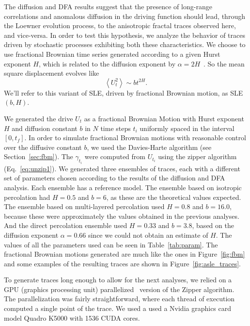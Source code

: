 The diffusion and DFA results suggest that the presence of long-range
correlations and anomalous diffusion in the driving function should lead,
through the Loewner evolution process, to the anisotropic fractal traces
observed here, and vice-versa. In order to test this hypothesis, we analyze the
behavior of traces driven by stochastic processes exhibiting both these
characteristics. We choose to use fractional Brownian time series generated
according to a given Hurst exponent $H$, which is related to the diffusion
exponent by $\alpha=2H$~\cite{Mandelbrot1968}. So the mean square displacement
evolves like
\begin{equation}
    \left\langle U_{t}^{2}\right\rangle \sim bt^{2H}.
\end{equation}
We'll refer to this variant of SLE, driven by fractional Brownian motion, as
SLE$(b,H)$.

We generated the drive $U_t$ as a fractional Brownian Motion with Hurst
exponent $H$ and diffusion constant $b$ in $N$ time steps $t_i$ uniformly
spaced in the interval $[0, t_f]$. In order to simulate fractional Brownian
motions with reasonable control over the diffusive constant $b$, we used the
Davies-Harte algorithm (see Section~\ref{sec:fbm}). The $\gamma_{t_i}$ were
computed from $U_{t_i}$ using the zipper algorithm (Eq.~\ref{eq:unzip1}). We
generated three ensembles of traces, each with a different set of parameters
chosen according to the results of the diffusion and DFA analysis. Each
ensemble has a reference model. The ensemble based on isotropic percolation had
$H=0.5$ and $b=6$, as these are the theoretical values expected. The ensemble
based on multi-layered percolation used $H=0.8$ and $b=16.0$, because these
were approximately the values obtained in the previous analyses. And the direct
percolation ensemble used $H=0.33$ and $b=3.8$, based on the diffusion exponent
$\alpha=0.66$ since we could not obtain an estimate of $H$. The values of all
the parameters used can be seen in Table~\ref{tab:param}. The fractional
Brownian motions generated are much like the ones in Figure~\ref{fig:fbm} and
some examples of the resulting traces are shown in
Figure~\ref{fig:asle_traces}.

To generate traces long enough to allow for the next analyses, we relied on a
GPU (graphics processing unit) parallelized~\cite{Che2008} version of the
Zipper algorithm. The parallelization was fairly straightforward, where each
thread of execution computed a single point of the trace. We used a used a
Nvidia graphics card model Quadro K5000 with 1536 CUDA cores.

